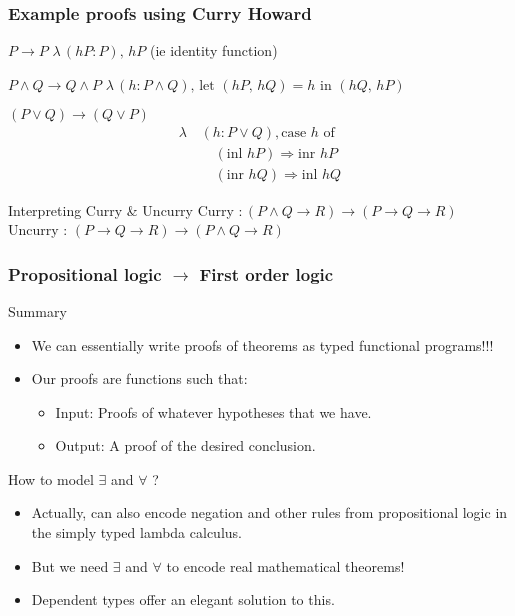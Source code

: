 \documentclass{beamer}
\begin{document}
\begin{frame}
  \frametitle{Example proofs using Curry Howard}
  \begin{block} {$P \rightarrow P$}
    $\lambda \, (hP : P), \, hP$ \qquad (ie identity function)
  \end{block}
  
  \begin{block} {$P \wedge Q \rightarrow Q \wedge P$}
    $\lambda \, (h : P \wedge Q), \, \text{let } (hP, \, hQ) = h \text{ in }
    (hQ, \, hP)$
  \end{block}
  
  \begin{block} {$(P \vee Q) \rightarrow (Q \vee P)$}
    \begin{align*}
      \lambda \, & (h : P \vee Q), \text{case } h \text{ of} \\
              & \quad (\text{inl } hP) \Rightarrow \text{inr } hP \\
              & \quad (\text{inr } hQ) \Rightarrow \text{inl } hQ
    \end{align*}
  \end{block}
  
  \begin{block} {Interpreting Curry \& Uncurry}
    Curry $: (P \wedge Q \rightarrow R) \rightarrow (P \rightarrow Q
    \rightarrow R)$ \\
    Uncurry : $(P \rightarrow Q \rightarrow R) \rightarrow (P \wedge Q \rightarrow R)$
  \end{block}
\end{frame}

\begin{frame}
  \frametitle{Propositional logic $\rightarrow$ First order logic}
  \begin{block} {Summary}
    \begin{itemize}[label=$\ast$]
    \item
      We can essentially write proofs of theorems as typed functional programs!!!
    \item
      Our proofs are functions such that:
      \begin{itemize}[label=$-$]
        \item Input: Proofs of whatever hypotheses that we have.
        \item Output: A proof of the desired conclusion.
        \end{itemize}
    \end{itemize}
  \end{block}
  \begin{block} {How to model $\exists$ and $\forall$ ?}
    \begin{itemize}[label=$\ast$]
    \item
      Actually, can also encode negation and other rules from propositional logic in
      the simply typed lambda calculus.
    \item
      But we need $\exists$ and $\forall$ to encode real mathematical theorems!
    \item
      Dependent types offer an elegant solution to this.
    \end{itemize}
  \end{block}
\end{frame}
\end{document}

